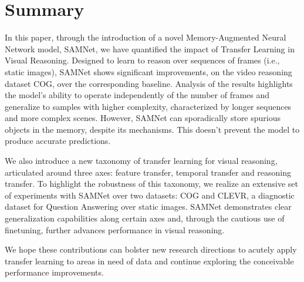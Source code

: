 \section{Summary}


In this paper, through the introduction of a novel Memory-Augmented Neural Network model, SAMNet, we have quantified the impact of Transfer Learning in Visual Reasoning. Designed to learn to reason over sequences of frames (i.e., static images), SAMNet shows significant improvements, on the video reasoning dataset COG, over the corresponding baseline. Analysis of the results highlights the model's ability to operate independently of the number of frames and generalize to samples with higher complexity, characterized by longer sequences and more complex scenes. However, SAMNet can sporadically store spurious objects in the memory, despite its mechanisms. This doesn't prevent the model to produce accurate predictions.

We also introduce a new taxonomy of transfer learning for visual reasoning, articulated around three axes: feature transfer, temporal transfer and reasoning transfer. To highlight the robustness of this taxonomy, we realize an extensive set of experiments with SAMNet over two datasets: COG and CLEVR, a diagnostic dataset for Question Answering over static images. SAMNet demonstrates clear generalization capabilities along certain axes and, through the cautious use of finetuning, further advances performance in visual reasoning.

We hope these contributions can bolster new research directions to acutely apply transfer learning to areas in need of data and continue exploring the conceivable performance improvements.
